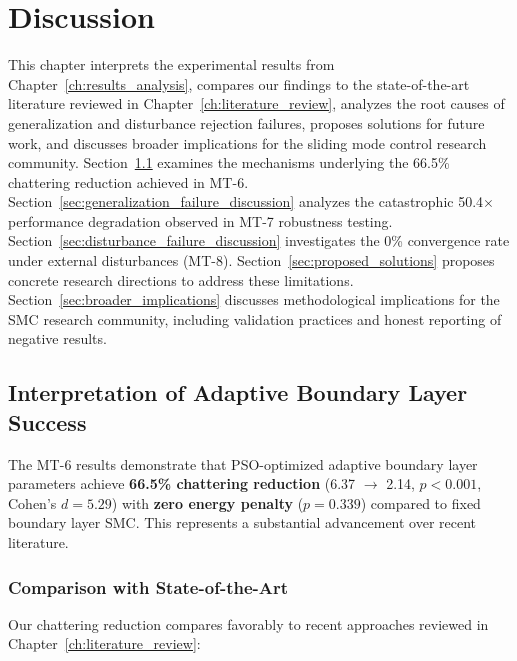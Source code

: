 \chapter{Discussion}
\label{ch:discussion}

This chapter interprets the experimental results from Chapter~\ref{ch:results_analysis}, compares our findings to the state-of-the-art literature reviewed in Chapter~\ref{ch:literature_review}, analyzes the root causes of generalization and disturbance rejection failures, proposes solutions for future work, and discusses broader implications for the sliding mode control research community. Section~\ref{sec:mt6_interpretation} examines the mechanisms underlying the 66.5\% chattering reduction achieved in MT-6. Section~\ref{sec:generalization_failure_discussion} analyzes the catastrophic 50.4$\times$ performance degradation observed in MT-7 robustness testing. Section~\ref{sec:disturbance_failure_discussion} investigates the 0\% convergence rate under external disturbances (MT-8). Section~\ref{sec:proposed_solutions} proposes concrete research directions to address these limitations. Section~\ref{sec:broader_implications} discusses methodological implications for the SMC research community, including validation practices and honest reporting of negative results.

\section{Interpretation of Adaptive Boundary Layer Success}
\label{sec:mt6_interpretation}

The MT-6 results demonstrate that PSO-optimized adaptive boundary layer parameters achieve \textbf{66.5\% chattering reduction} (6.37 $\to$ 2.14, $p < 0.001$, Cohen's $d = 5.29$) with \textbf{zero energy penalty} ($p = 0.339$) compared to fixed boundary layer SMC. This represents a substantial advancement over recent literature.

\subsection{Comparison with State-of-the-Art}
\label{subsec:sota_comparison}

Our chattering reduction compares favorably to recent approaches reviewed in Chapter~\ref{ch:literature_review}:

